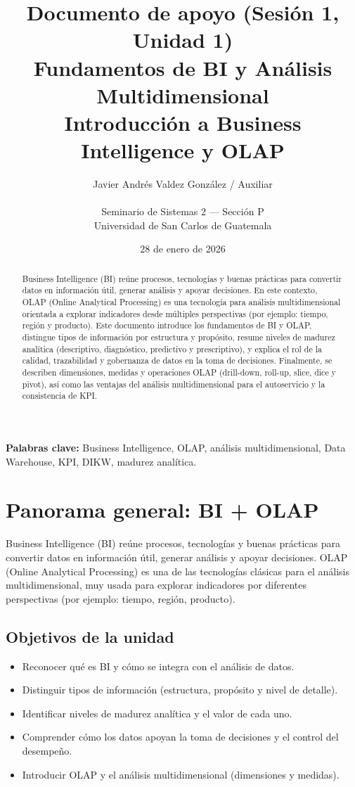 \documentclass[12pt]{article}
\title{\textbf{Documento de apoyo (Sesión 1, Unidad 1)}\\
\large Fundamentos de BI y Análisis Multidimensional\\
\normalsize Introducción a Business Intelligence y OLAP}
\author{Javier Andrés Valdez González / Auxiliar \\\\
\small Seminario de Sistemas 2 — Sección P \\
\small Universidad de San Carlos de Guatemala}
\date{28 de enero de 2026}
\begin{document}
\maketitle

\begin{abstract}
Business Intelligence (BI) reúne procesos, tecnologías y buenas prácticas para convertir datos en información útil, generar análisis y apoyar decisiones. En este contexto, OLAP (Online Analytical Processing) es una tecnología para análisis multidimensional orientada a explorar indicadores desde múltiples perspectivas (por ejemplo: tiempo, región y producto). Este documento introduce los fundamentos de BI y OLAP, distingue tipos de información por estructura y propósito, resume niveles de madurez analítica (descriptivo, diagnóstico, predictivo y prescriptivo), y explica el rol de la calidad, trazabilidad y gobernanza de datos en la toma de decisiones. Finalmente, se describen dimensiones, medidas y operaciones OLAP (drill-down, roll-up, slice, dice y pivot), así como las ventajas del análisis multidimensional para el autoservicio y la consistencia de KPI.
\end{abstract}

\textbf{Palabras clave:} Business Intelligence, OLAP, análisis multidimensional, Data Warehouse, KPI, DIKW, madurez analítica.

\newpage
\tableofcontents

\section{Panorama general: BI + OLAP}
Business Intelligence (BI) reúne procesos, tecnologías y buenas prácticas para convertir datos en información útil, generar análisis y apoyar decisiones. OLAP (Online Analytical Processing) es una de las tecnologías clásicas para el análisis multidimensional, muy usada para explorar indicadores por diferentes perspectivas (por ejemplo: tiempo, región, producto).

\subsection*{Objetivos de la unidad}
\begin{itemize}[leftmargin=*, itemsep=0.25em]
  \item Reconocer qué es BI y cómo se integra con el análisis de datos.
  \item Distinguir tipos de información (estructura, propósito y nivel de detalle).
  \item Identificar niveles de madurez analítica y el valor de cada uno.
  \item Comprender cómo los datos apoyan la toma de decisiones y el control del desempeño.
  \item Introducir OLAP y el análisis multidimensional (dimensiones y medidas).
\end{itemize}
\end{document}
